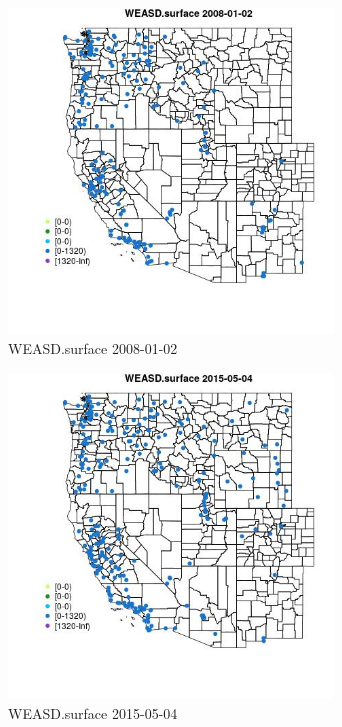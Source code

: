 \begin{figure} 
\centering  
\includegraphics[width=0.77\textwidth]{Code_Outputs/Report_ML_input_PM25_Step4_part_e_de_duplicated_aves_compiled_2019-05-18wNAs_MapObsWEASDsurface2008-01-02.jpg} 
\caption{\label{fig:Report_ML_input_PM25_Step4_part_e_de_duplicated_aves_compiled_2019-05-18wNAsMapObsWEASDsurface2008-01-02}WEASD.surface 2008-01-02} 
\end{figure} 
 

\begin{figure} 
\centering  
\includegraphics[width=0.77\textwidth]{Code_Outputs/Report_ML_input_PM25_Step4_part_e_de_duplicated_aves_compiled_2019-05-18wNAs_MapObsWEASDsurface2015-05-04.jpg} 
\caption{\label{fig:Report_ML_input_PM25_Step4_part_e_de_duplicated_aves_compiled_2019-05-18wNAsMapObsWEASDsurface2015-05-04}WEASD.surface 2015-05-04} 
\end{figure} 
 

